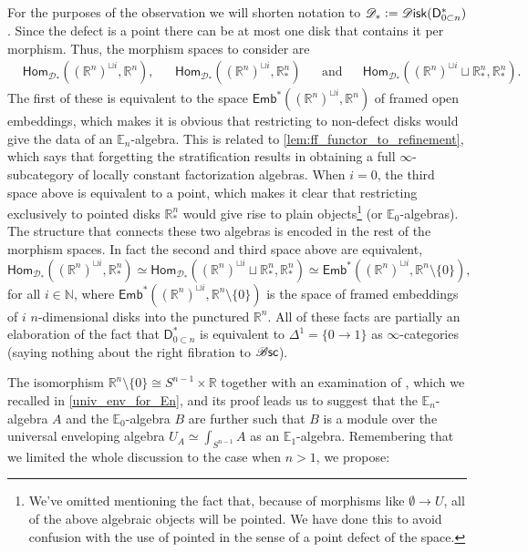 \documentclass[../text]{subfiles}
\begin{document}
\begin{observation}\label{obs:explore_D*}
    For the purposes of the observation we will shorten notation to $\mathscr{D}_* := \disk (\mathsf{D}_{0 \subset n}^*)$. Since the defect is a point there can be at most one disk that contains it per morphism. Thus, the morphism spaces to consider are
    \begin{align}
        &\mathsf{Hom}_{\mathscr{D}_*} ((\mathbb{R}^n)^{\sqcup i}, \mathbb{R}^n),& &\mathsf{Hom}_{\mathscr{D}_*} ((\mathbb{R}^n)^{\sqcup i}, \mathbb{R}^n_*)& &\mathrm{and}& &\mathsf{Hom}_{\mathscr{D}_*} ((\mathbb{R}^n)^{\sqcup i} \sqcup \mathbb{R}^n_*, \mathbb{R}^n_*).&
    \end{align}
    The first of these is equivalent to the space $\mathsf{Emb}^*((\mathbb{R}^n)^{\sqcup i}, \mathbb{R}^n)$ of framed open embeddings, which makes it is obvious that restricting to non-defect disks would give the data of an $\mathbb{E}_n$-algebra. This is related to \cref{lem:ff_functor_to_refinement}, which says that forgetting the stratification results in obtaining a full $\infty$-subcategory of locally constant factorization algebras. When $i=0$, the third space above is equivalent to a point, which makes it clear that restricting exclusively to pointed disks $\mathbb{R}^n_*$ would give rise to plain objects\footnote{We've omitted mentioning the fact that, because of morphisms like $\emptyset \xrightarrow{} U$, all of the above algebraic objects will be pointed. We have done this to avoid confusion with the use of pointed in the sense of a point defect of the space.} (or $\mathbb{E}_0$-algebras). The structure that connects these two algebras is encoded in the rest of the morphism spaces. In fact the second and third space above are equivalent,
    \begin{equation}
        \mathsf{Hom}_{\mathscr{D}_*} ((\mathbb{R}^n)^{\sqcup i}, \mathbb{R}^n_*) \simeq \mathsf{Hom}_{\mathscr{D}_*} ((\mathbb{R}^n)^{\sqcup i} \sqcup \mathbb{R}^n_*, \mathbb{R}^n_*) \simeq \mathsf{Emb}^* ((\mathbb{R}^n)^{\sqcup i}, \mathbb{R}^n \setminus \{0\}),
    \end{equation}
    for all $i \in \mathbb{N}$, where $\mathsf{Emb}^* ((\mathbb{R}^n)^{\sqcup i}, \mathbb{R}^n \setminus \{0\})$ is the space of framed embeddings of $i$ $n$-dimensional disks into the punctured $\mathbb{R}^n$. All of these facts are partially an elaboration of the fact that $\mathsf{D}_{0 \subset n}^*$ is equivalent to $\Delta^1 = \{0 \xrightarrow{} 1\}$ as $\infty$-categories (saying nothing about the right fibration to $\mathscr{B} \mathsf{sc}$). 

    The isomorphism $\mathbb{R}^n \setminus \{ 0 \} \cong S^{n-1} \times \mathbb{R}$ together with an examination of \cite[prop.3.16]{francis2013}, which we recalled in \cref{univ_env_for_En}, and its proof leads us to suggest that the $\mathbb{E}_n$-algebra $A$ and the $\mathbb{E}_0$-algebra $B$ are further such that $B$ is a module over the universal enveloping algebra $U_A \simeq \int_{S^{n-1}} A$ as an $\mathbb{E}_1$-algebra. Remembering that we limited the whole discussion to the case when $n>1$, we propose:
\end{observation}
\end{document}
